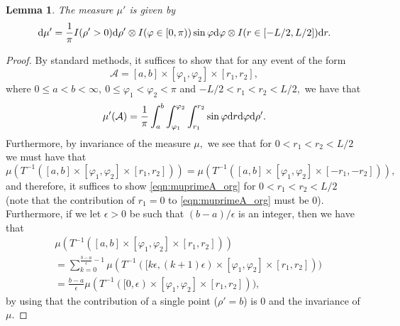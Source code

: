 \documentclass[a4paper,12pt]{article}
\newcommand{\CA}{{\mathcal{A}}}
\newcommand{\dd}{{\rm d}}
\newtheorem{lemma}[theorem]{Lemma}
\begin{document}
\begin{lemma} \label{lemma:altPoisson}
The measure $\mu'$ is given by 
\[
\dd \mu'= \frac{1}{\pi}I(\rho'>0)\dd \rho' 
\otimes I(\varphi\in[0,\pi))\sin \varphi \dd \varphi
\otimes I(r\in[-L/2,L/2])\dd r.
\]
\end{lemma}
\begin{proof}
By standard methods, it suffices to show that for any event of the form 
\[
\CA=[a,b] \times [\varphi_1,\varphi_2]\times [r_1,r_2] ,
\]
where $0\leq a<b<\infty,\ 0\leq \varphi_1<\varphi_2<\pi$ and $-L/2<r_1<r_2<L/2,$ 
we have that 
\begin{equation} \label{eqn:muprimeA_org} 
\mu'(\CA)=\frac{1}{\pi}
\int_{a}^b \int_{\varphi_1}^{\varphi_2} \int_{r_1}^{r_2} 
\sin \varphi  \dd r \dd \varphi  \dd \rho'.    
\end{equation}
Furthermore, by invariance of the measure $\mu,$ we see that for $0<r_1<r_2<L/2$ we must have that
\[
\mu(T^{-1}([a,b] \times [\varphi_1,\varphi_2]\times [r_1,r_2] ))
=\mu(T^{-1}([a,b] \times [\varphi_1,\varphi_2]\times [-r_1,-r_2] )),
\]
and therefore, it suffices to show \eqref{eqn:muprimeA_org} for $0<r_1<r_2<L/2$
(note that the contribution of $r_1=0$ to \eqref{eqn:muprimeA_org} must be 0).
Furthermore, if we let $\epsilon>0$ be such that $(b-a)/\epsilon$ is an integer,
then we have that 
\begin{align*}
& \mu(T^{-1}([a,b] \times [\varphi_1,\varphi_2]\times [r_1,r_2] )) \\
& =\sum_{k=0}^{\frac{b-a}{\epsilon}-1}  
\mu(T^{-1}([k\epsilon,(k+1)\epsilon) \times [\varphi_1,\varphi_2]\times [r_1,r_2] )) \\
& =\frac{b-a}{\epsilon}\mu(T^{-1}([0,\epsilon) 
\times [\varphi_1,\varphi_2] \times [r_1,r_2] )), 
\end{align*}
by using that the contribution of a single point ($\rho'=b$) is 0 and the invariance of $\mu.$



\end{proof}
\end{document}
